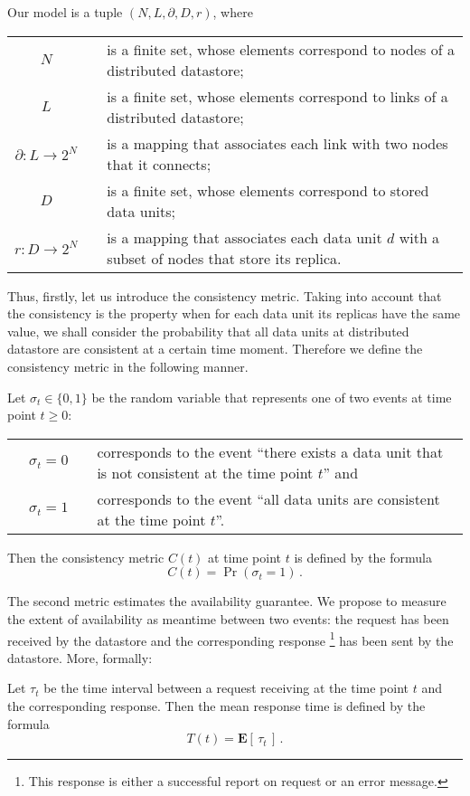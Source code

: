 \documentclass{llncs}
\begin{document}
Our model is a tuple $(N, L, \partial,D, r)$, where \\
\begin{tabular*}{\textwidth}{cp{0.5cm}p{}}
$N$&& is a finite set, whose elements correspond to nodes of a distributed datastore; \\
$L$&& is a finite set, whose elements correspond to links of a distributed datastore; \\
$\partial:L\rightarrow 2^N$&& is a mapping that associates each link with two nodes that it connects;\\
$D$&& is a finite set, whose elements correspond to stored data units;\\
$r:D\rightarrow 2^N$&& is a mapping that associates each data unit $d$ with a subset of nodes 
that store its replica.
\end{tabular*}

Thus, firstly, let us introduce the consistency metric. 
Taking into account that the consistency is the property when for each data unit its replicas 
have the same value, we shall consider the probability that all data units
at distributed datastore are consistent at a certain time moment. 
Therefore we define the consistency metric in the following manner.
\begin{definition}
Let $\sigma_t\in\{0,1\}$ be the random variable that represents one of two events at
time point $t\geq 0$:\\
\begin{tabular*}{\textwidth}{p{0.5cm}cp{0.5cm}p{}}
&$\sigma_t=0$ && corresponds to the event ``there exists a data unit that is not consistent
	at the time point $t$'' and\\
&$\sigma_t=1$ && corresponds to the event ``all data units are consistent at the time point $t$''.
\end{tabular*}
Then the consistency metric $C(t)$ at time point $t$ is defined by the formula
\begin{equation}
	C(t)=\Pr(\sigma_t=1)\,.
\end{equation}
\end{definition}

The second metric estimates the availability guarantee.
We propose to measure the extent of availability as meantime between two events: the request
has been received by the datastore and the corresponding response
\footnote{This response is either a successful report on request or an error message.}
has been sent by the datastore. More, formally:
\begin{definition}
Let $\tau_t$ be the time interval between a request receiving at the time point $t$ and
the corresponding response.
Then the mean response time is defined by the formula
\begin{equation}
	T(t)=\mathbf{E}[\,\tau_t\,]\,.
\end{equation}
\end{definition}
\end{document}
